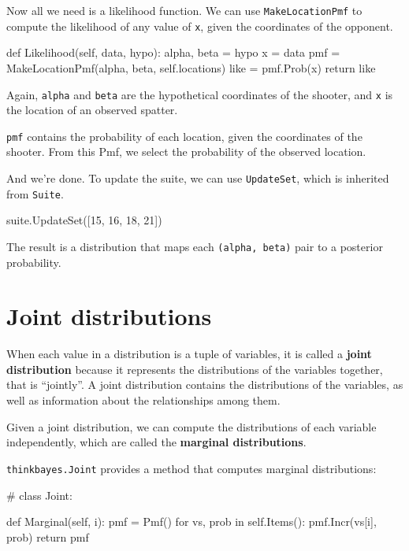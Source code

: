 \documentclass[12pt]{book}
\theoremstyle{exercise}
\begin{document}
Now all we need is a likelihood function.
We can use {\tt MakeLocationPmf} to compute the likelihood
of any value of {\tt x}, given the coordinates of the opponent.

\begin{code}
    def Likelihood(self, data, hypo):
        alpha, beta = hypo
        x = data
        pmf = MakeLocationPmf(alpha, beta, self.locations)
        like = pmf.Prob(x)
        return like
\end{code}

Again, {\tt alpha} and {\tt beta} are the hypothetical coordinates of
the shooter, and {\tt x} is the location of an observed spatter.

{\tt pmf} contains the probability of each location, given the
coordinates of the shooter.  From this Pmf, we select the probability
of the observed location.

And we're done.  To update the suite, we can use {\tt UpdateSet},
which is inherited from {\tt Suite}.

\begin{code}
suite.UpdateSet([15, 16, 18, 21])
\end{code}

The result is a distribution that maps each {\tt (alpha, beta)} pair
to a posterior probability.


\section{Joint distributions}

When each value in a distribution is a tuple of variables, it is
called a {\bf joint distribution} because it represents the
distributions of the variables together, that is ``jointly''.
A joint distribution contains the distributions of the variables,
as well as information about the relationships among them.

Given a joint distribution, we can compute the distributions
of each variable independently, which are called the {\bf marginal
distributions}.

{\tt thinkbayes.Joint} provides a method that computes marginal
distributions:

\begin{code}
# class Joint:

    def Marginal(self, i):
        pmf = Pmf()
        for vs, prob in self.Items():
            pmf.Incr(vs[i], prob)
        return pmf
\end{code}
\end{document}
